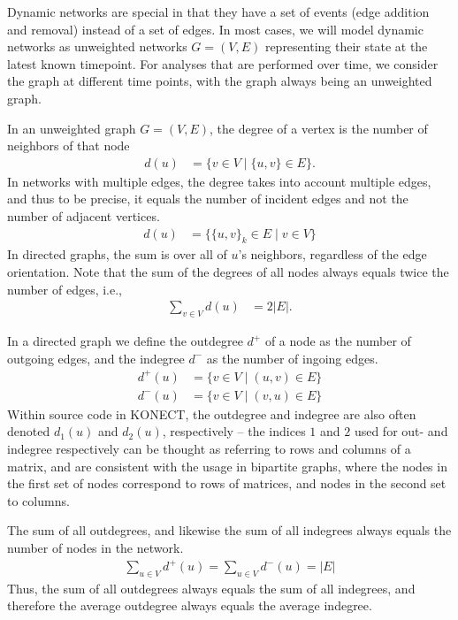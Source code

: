\documentclass{article}
\begin{document}
Dynamic networks are special in that they have a set of events (edge
addition and removal) instead of a set of edges.  In most cases, we will
model dynamic networks as unweighted networks $G=(V,E)$ representing
their state at the latest known timepoint.  For analyses that are
performed over time, we consider the graph at different time points,
with the graph always being an unweighted graph. 

In an unweighted graph $G=(V,E)$, the degree of a vertex is the number
of neighbors of that node
\begin{align}
  d(u) &= \{ v \in V \mid \{u,v\} \in E \}. 
\end{align}
In networks with multiple edges, the degree takes into account multiple
edges, and thus to be precise, it equals the number of incident edges
and not the number of adjacent vertices. 
\begin{align}
  d(u) &= \{ \{u,v\}_k \in E \mid v \in V \}
\end{align}
In directed graphs, the sum is over all of $u$'s neighbors, regardless
of the edge orientation. 
Note that the sum of the degrees of all nodes always equals twice the
number of edges, i.e.,
\begin{align}
  \sum_{v\in V} d(u) &= 2|E|. 
\end{align}

In a directed graph we define the outdegree $d^+$ of a node as the number of
outgoing edges, and the indegree $d^-$ as the number of ingoing edges.
\begin{align}
  d^+(u) &= \{ v \in V \mid (u,v) \in E \} \\
  d^-(u) &= \{ v \in V \mid (v,u) \in E \}
\end{align}
Within source code in KONECT, the outdegree and indegree are also often denoted $d_1(u)$ and
$d_2(u)$, respectively -- the indices $1$ and $2$ used for out-
and indegree respectively can be thought as referring to rows and
columns of a matrix, and are consistent with the usage in bipartite
graphs, where the nodes in the first set of nodes correspond to rows of
matrices, and nodes in the second set to columns. 

The sum of all outdegrees, and likewise the sum of all indegrees always
equals the number of nodes in the network.  
\begin{align}
  \sum_{u\in V} d^+(u) = \sum_{u \in V} d^-(u) = |E|
\end{align}
Thus, the sum of all outdegrees always equals the sum of all indegrees,
and therefore the average outdegree always equals the average indegree.  
\end{document}
